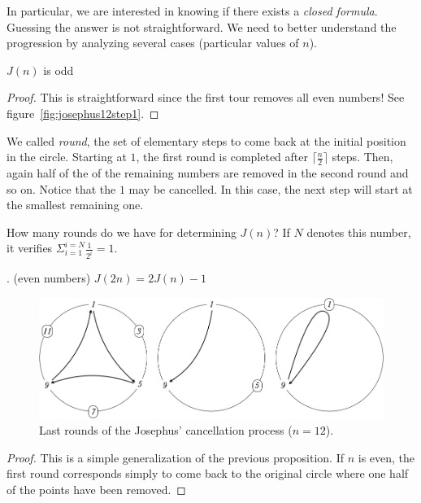 {In particular, we are interested in knowing if there exists a \textit{closed formula}.
Guessing the answer is not straightforward. 
We need to better understand the progression by analyzing several cases (particular values of $n$).
\medskip

\begin{prop}
$J(n)$ is odd
\end{prop}

\begin{proof}
This is straightforward since the first tour removes all even numbers!
See figure~\ref{fig:josephus12step1}. 
\end{proof}
\medskip

\noindent
We called \textit{round}, the set of elementary steps to come back at the initial position in the circle. 
Starting at $1$, the first round is completed after $\lceil \frac{n}{2} \rceil$ steps. 
Then, again half of the of the remaining numbers are removed in the second round and so on.
Notice that the $1$ may be cancelled. In this case, the next step will start at the smallest remaining one.

How many rounds do we have for determining $J(n)$?
If $N$ denotes this number, it verifies
$\Sigma_{i=1}^{i=N} \frac{1}{2^i} = 1$.
\medskip

\begin{prop}. (even numbers)
$J(2n) = 2J(n)-1$ 
\end{prop}

\begin{figure}[h]
\begin{center}
        \includegraphics[scale=0.35]{FiguresMaths/josephus12LastSteps}
        \caption{Last rounds of the Josephus' cancellation process ($n=12$).}
        \label{fig:josephus12step2}
\end{center}
\end{figure}

{\begin{proof}
This is a simple generalization of the previous proposition.
If $n$ is even, the first round corresponds simply to come back to the original circle where one half of the points have been removed. 
\end{proof}

}}
